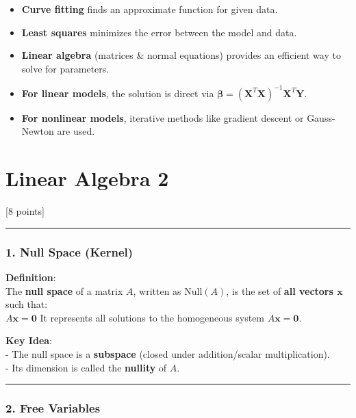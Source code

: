 \documentclass[11pt]{article}
\providecommand{\tightlist}{%
      \setlength{\itemsep}{0pt}\setlength{\parskip}{0pt}}
\begin{document}
\begin{itemize}
\tightlist
\item
  \textbf{Curve fitting} finds an approximate function for given data.
\item
  \textbf{Least squares} minimizes the error between the model and data.
\item
  \textbf{Linear algebra} (matrices \& normal equations) provides an
  efficient way to solve for parameters.
\item
  \textbf{For linear models}, the solution is direct via
  \(\boldsymbol{\beta} = (\mathbf{X}^T \mathbf{X})^{-1} \mathbf{X}^T \mathbf{Y}\).
\item
  \textbf{For nonlinear models}, iterative methods like gradient descent
  or Gauss-Newton are used.
\end{itemize}

    \section{Linear Algebra 2}\label{linear-algebra-2}

{[}8 points{]}

    \begin{center}\rule{0.5\linewidth}{0.5pt}\end{center}

\subsubsection{\texorpdfstring{\textbf{1. Null Space
(Kernel)}}{1. Null Space (Kernel)}}\label{null-space-kernel}

\textbf{Definition}:\\
The \textbf{null space} of a matrix \(A\), written as
\(\text{Null}(A)\), is the set of \textbf{all vectors \(\mathbf{x}\)}
such that:\\
\(A\mathbf{x} = \mathbf{0}\) It represents all solutions to the
homogeneous system \(A\mathbf{x} = \mathbf{0}\).

\textbf{Key Idea}:\\
- The null space is a \textbf{subspace} (closed under addition/scalar
multiplication).\\
- Its dimension is called the \textbf{nullity} of \(A\).

\begin{center}\rule{0.5\linewidth}{0.5pt}\end{center}

\subsubsection{\texorpdfstring{\textbf{2. Free
Variables}}{2. Free Variables}}\label{free-variables}
\end{document}
